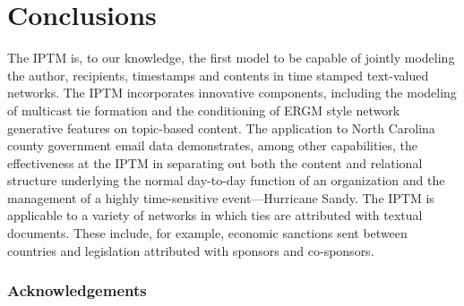 \documentclass[twoside]{article}
\begin{document}
\section{Conclusions}
The IPTM is, to our knowledge, the first model to be capable of jointly modeling the author, recipients, timestamps and contents in time stamped text-valued networks. The IPTM incorporates innovative components, including the modeling of multicast tie formation and the conditioning of ERGM style network generative features on topic-based content. The application to North Carolina county government email data demonstrates, among other capabilities, the effectiveness at the IPTM in separating out both the content and relational structure underlying the normal day-to-day function of an organization and the management of a highly time-sensitive event---Hurricane Sandy. The IPTM is applicable to a variety of networks in which ties are attributed with textual documents. These include, for example, economic sanctions sent between countries and legislation attributed with sponsors and co-sponsors. 
\subsubsection*{Acknowledgements}



\end{document}
